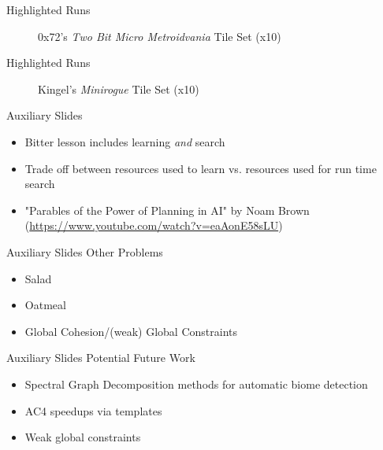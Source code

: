 \documentclass{beamer}
\begin{document}
  \begin{frame}[fragile]{Highlighted Runs}
    \begin{figure}
      0x72's \textit{Two Bit Micro Metroidvania} Tile Set (x10)
    \end{figure}
  \end{frame}

  \begin{frame}[fragile]{Highlighted Runs}
    \begin{figure}
      Kingel's \textit{Minirogue} Tile Set (x10)
    \end{figure}
  \end{frame}


  \begin{frame}[fragile]{Auxiliary Slides}
    \begin{itemize}
      \item Bitter lesson includes learning \textit{and} search
      \item Trade off between resources used to learn vs. resources used for run time search
      \item "Parables of the Power of Planning in AI" by Noam Brown (\url{https://www.youtube.com/watch?v=eaAonE58sLU})
    \end{itemize}
  \end{frame}

  \begin{frame}[fragile]{Auxiliary Slides}
    Other Problems

    \begin{itemize}
      \item Salad
      \item Oatmeal
      \item Global Cohesion/(weak) Global Constraints
    \end{itemize}
  \end{frame}


  \begin{frame}[fragile]{Auxiliary Slides}
    Potential Future Work

    \begin{itemize}
      \item Spectral Graph Decomposition methods for automatic biome detection
      \item AC4 speedups via templates
      \item Weak global constraints
    \end{itemize}
  \end{frame}
\end{document}
